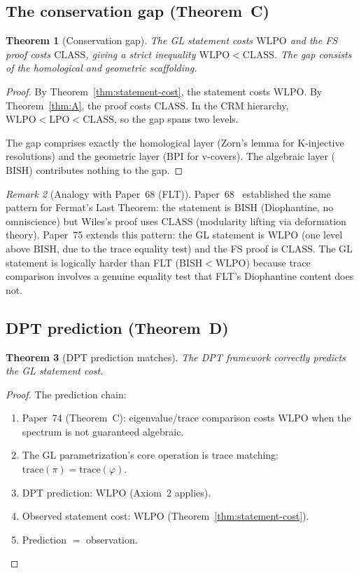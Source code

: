 \documentclass[12pt, a4paper]{article}
\theoremstyle{plain}
\newtheorem{theorem}{Theorem}[section]
\theoremstyle{definition}
\theoremstyle{remark}
\newtheorem{remark}[theorem]{Remark}
\newcommand{\BISH}{\mathrm{BISH}}
\newcommand{\WLPO}{\mathrm{WLPO}}
\newcommand{\LPO}{\mathrm{LPO}}
\newcommand{\CLASS}{\mathrm{CLASS}}
\newcommand{\BPI}{\mathrm{BPI}}
\begin{document}
\subsection{The conservation gap (Theorem~C)}\label{sec:gap}

\begin{theorem}[Conservation gap]\label{thm:gap}
The GL statement costs $\WLPO$ and the FS proof costs $\CLASS$,
giving a strict inequality $\WLPO < \CLASS$.
The gap consists of the homological and geometric scaffolding.
\end{theorem}

\begin{proof}
By Theorem~\ref{thm:statement-cost}, the statement costs $\WLPO$.
By Theorem~\ref{thm:A}, the proof costs $\CLASS$.  In the CRM
hierarchy, $\WLPO < \LPO < \CLASS$, so the gap spans two levels.

The gap comprises exactly the homological layer (Zorn's lemma for
K-injective resolutions) and the geometric layer ($\BPI$ for
v-covers).  The algebraic layer ($\BISH$) contributes nothing to
the gap.
\end{proof}

\begin{remark}[Analogy with Paper~68 (FLT)]\label{rem:flt}
Paper~68~\cite{lee-p68} established the same pattern for Fermat's Last Theorem:
the statement is $\BISH$ (Diophantine, no omniscience) but Wiles's
proof uses $\CLASS$ (modularity lifting via deformation theory).
Paper~75 extends this pattern: the GL statement is $\WLPO$ (one
level above $\BISH$, due to the trace equality test) and the FS
proof is $\CLASS$.  The GL statement is logically harder than FLT
($\BISH < \WLPO$) because trace comparison involves a genuine
equality test that FLT's Diophantine content does not.
\end{remark}

\subsection{DPT prediction (Theorem~D)}\label{sec:prediction}

\begin{theorem}[DPT prediction matches]\label{thm:dpt}
The DPT framework correctly predicts the GL statement cost.
\end{theorem}

\begin{proof}
The prediction chain:
\begin{enumerate}[label=(\arabic*)]
  \item Paper~74 (Theorem~C): eigenvalue/trace comparison costs
    $\WLPO$ when the spectrum is not guaranteed algebraic.
  \item The GL parametrization's core operation is trace matching:
    $\mathrm{trace}(\pi) = \mathrm{trace}(\varphi)$.
  \item DPT prediction: $\WLPO$ (Axiom~2 applies).
  \item Observed statement cost: $\WLPO$ (Theorem~\ref{thm:statement-cost}).
  \item Prediction $=$ observation.
\end{enumerate}
\end{proof}
\end{document}
